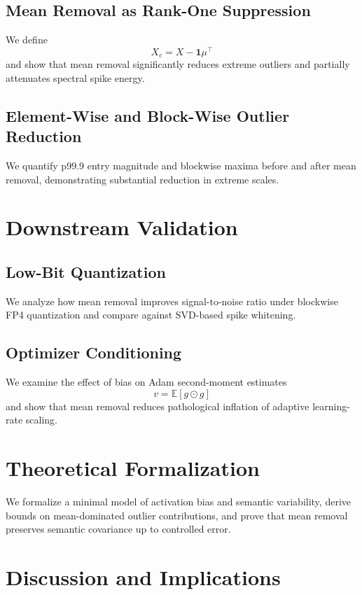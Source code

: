\subsection{Mean Removal as Rank-One Suppression}

We define
\[
X_c = X - \mathbf{1}\mu^\top
\]
and show that mean removal significantly reduces extreme outliers and
partially attenuates spectral spike energy.


\subsection{Element-Wise and Block-Wise Outlier Reduction}

We quantify p99.9 entry magnitude and blockwise maxima before and after
mean removal, demonstrating substantial reduction in extreme scales.


\section{Downstream Validation}
\label{sec:applications}

\subsection{Low-Bit Quantization}
\label{subsec:quantization}

We analyze how mean removal improves signal-to-noise ratio under
blockwise FP4 quantization and compare against SVD-based spike whitening.


\subsection{Optimizer Conditioning}
\label{subsec:optimizer}

We examine the effect of bias on Adam second-moment estimates
\[
v = \mathbb{E}[g \odot g]
\]
and show that mean removal reduces pathological inflation of adaptive
learning-rate scaling.


\section{Theoretical Formalization}
\label{sec:theory}

We formalize a minimal model of activation bias and semantic variability,
derive bounds on mean-dominated outlier contributions, and prove that
mean removal preserves semantic covariance up to controlled error.


\section{Discussion and Implications}
\label{sec:discussion}

